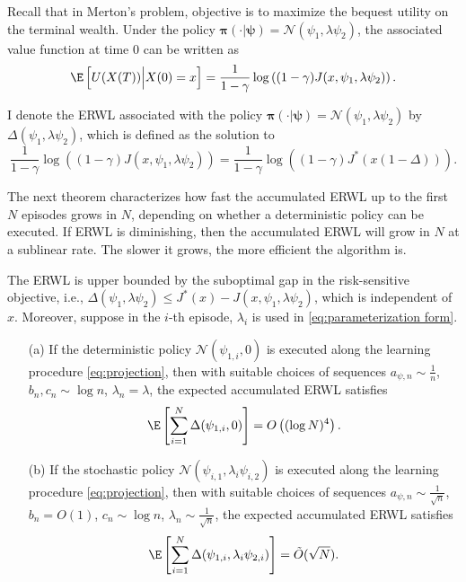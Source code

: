 Recall that in Merton's problem, objective is to maximize the bequest utility on the terminal wealth. Under the policy $\bm\pi(\cdot|\bm\psi)= \mathcal{N}( \psi_1, \lambda \psi_2)$, the associated value function at time 0 can be written as  
\[ \E\left[ U(X(T)) \Big| X(0) = x \right] = \frac{1}{1-\gamma} \log\left((1-\gamma) J(x,\psi_1,\lambda \psi_2) \right) . \]

I denote the ERWL associated with the policy $\bm\pi(\cdot|\bm\psi)= \mathcal{N}( \psi_1, \lambda \psi_2)$ by $\Delta(\psi_1,\lambda \psi_2)$, which is defined as the solution to 
\[ \frac{1}{1-\gamma} \log\left((1-\gamma) J(x,\psi_1,\lambda\psi_2) \right) = \frac{1}{1-\gamma} \log\left((1-\gamma) J^*(x(1-\Delta)) \right) . \]

The next theorem characterizes how fast the accumulated ERWL up to the first $N$ episodes grows in $N$, depending on whether a deterministic policy can be executed. If ERWL is diminishing, then the accumulated ERWL will grow in $N$ at a sublinear rate. The slower it grows, the more efficient the algorithm is. 

\begin{theorem}
	\label{thm:regret merton}
	The ERWL is upper bounded by the suboptimal gap in the risk-sensitive objective, i.e., $\Delta(\psi_1,\lambda \psi_2) \leq J^*(x) -  J(x,\psi_1,\lambda \psi_2)$, which is independent of $x$. Moreover, suppose in the $i$-th episode, $\lambda_i$ is used in \eqref{eq:parameterization form}. 
	\begin{enumerate}
		\item[(a)] If the deterministic policy $\mathcal{N}(\psi_{1,i},0)$ is executed along the learning procedure \eqref{eq:projection}, then with suitable choices of sequences $a_{\psi,n} \sim \frac{1}{n}$, $b_n,c_n \sim \log n$, $\lambda_n = \lambda$, the expected accumulated ERWL satisfies
		\[ \E\left[ \sum_{i=1}^N  \Delta(\psi_{1,i},0) \right] = O\left( (\log N)^4 \right) .\]
		\item[(b)] If the stochastic policy $\mathcal{N}(\psi_{i,1},\lambda_i \psi_{i,2})$ is executed along the learning procedure \eqref{eq:projection}, then with suitable choices of sequences $a_{\psi,n} \sim \frac{1}{\sqrt{n}}$, $b_n = O(1)$, $c_n \sim \log n$, $\lambda_n \sim \frac{1}{\sqrt{n}}$, the expected accumulated ERWL satisfies
		\[ \E\left[ \sum_{i=1}^N  \Delta(\psi_{1,i},\lambda_i \psi_{2,i}) \right] = \tilde{O}(\sqrt{N}) .\]
	\end{enumerate}
\end{theorem}

